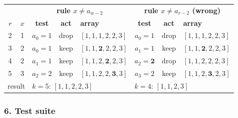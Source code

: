 \begin{tracebox}
\centering\footnotesize\setlength{\tabcolsep}{4pt}
\begin{tabular}{@{}cc|ccl|ccl@{}}
\toprule
& & \multicolumn{3}{c|}{\textbf{rule $x \ne a_{w-2}$}} & \multicolumn{3}{c}{\textbf{rule $x \ne a_{r-2}$ (wrong)}} \\
$r$ & $x$ & \textbf{test} & \textbf{act} & \textbf{array} & \textbf{test} & \textbf{act} & \textbf{array} \\
\midrule
2 & 1 & $a_0 = 1$ & drop & $[1,1,1,2,2,3]$ & $a_0 = 1$ & drop & $[1,1,1,2,2,3]$ \\
3 & 2 & $a_0 = 1$ & keep & $[1,1,\mathbf{2},2,2,3]$ & $a_1 = 1$ & keep & $[1,1,\mathbf{2},2,2,3]$ \\
4 & 2 & $a_1 = 1$ & keep & $[1,1,2,\mathbf{2},2,3]$ & $a_2 = \mathbf{2}$ & drop & $[1,1,2,2,2,3]$ \\
5 & 3 & $a_2 = 2$ & keep & $[1,1,2,2,\mathbf{3},3]$ & $a_3 = 2$ & keep & $[1,1,2,\mathbf{3},2,3]$ \\
\midrule
\multicolumn{2}{c|}{result} & \multicolumn{3}{l|}{$k = 5$: $[1, 1, 2, 2, 3]$} & \multicolumn{3}{l}{$k = 4$: $[1, 1, 2, 3]$ \wa{}} \\
\bottomrule
\end{tabular}
\end{tracebox}

\subsubsection*{6. Test suite}

